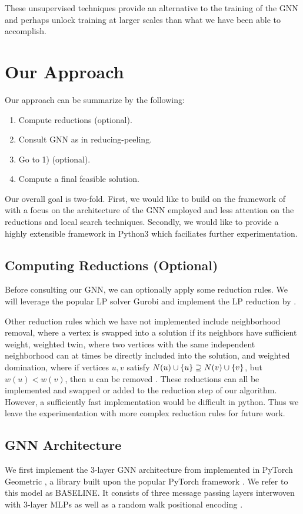 \documentclass{article}
\DeclarePairedDelimiter{\set}{\lbrace}{\rbrace}
\begin{document}
These unsupervised techniques provide an alternative to the training of the GNN
and perhaps unlock training at larger scales than what we have been able to accomplish.

\section{Our Approach}
Our approach can be summarize by the following:
\begin{enumerate}[1)]
  \item Compute reductions (optional).
  \item Consult GNN as in reducing-peeling.
  \item Go to 1) (optional).
  \item Compute a final feasible solution.
\end{enumerate}
Our overall goal is two-fold.
First, we would like to build on the framework of \citet{langedal_et_al}
with a focus on the architecture of the GNN employed
and less attention on the reductions and local search techniques.
Secondly, we would like to provide a highly extensible framework in Python3
which faciliates further experimentation.

\subsection{Computing Reductions (Optional)}
Before consulting our GNN,
we can optionally apply some reduction rules.
We will leverage the popular LP solver Gurobi \citet{gurobi}
and implement the LP reduction by \citet{lpreduction}.

Other reduction rules which we have not implemented include
neighborhood removal,
where a vertex is swapped into a solution if its neighbors have sufficient weight,
weighted twin,
where two vertices with the same independent neighborhood can at times be directly included into the solution,
and weighted domination,
where if vertices $u, v$ satisfy $N(u)\cup \set{u} \supseteq N(v)\cup \set{v}$,
but $w(u) < w(v)$,
then $u$ can be removed \citet{kamis}.
These reductions can all be implemented and swapped or added to the reduction step of our algorithm.
However,
a sufficiently fast implementation would be difficult in python.
Thus we leave the experimentation with more complex reduction rules for future work.

\subsection{GNN Architecture}
We first implement the 3-layer GNN architecture from \citet{langedal_et_al}
implemented in PyTorch Geometric \citet{pyg},
a library built upon the popular PyTorch framework \citet{pytorch}.
We refer to this model as BASELINE.
It consists of three message passing layers
interwoven with 3-layer MLPs
as well as a random walk positional encoding \citet{dwivedi2021graph}.
\end{document}
